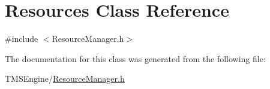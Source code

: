 \hypertarget{class_resources}{}\section{Resources Class Reference}
\label{class_resources}


{\ttfamily \#include $<$Resource\+Manager.\+h$>$}



The documentation for this class was generated from the following file\+:\begin{DoxyCompactItemize}
\item 
T\+M\+S\+Engine/\hyperlink{_resource_manager_8h}{Resource\+Manager.\+h}\end{DoxyCompactItemize}
